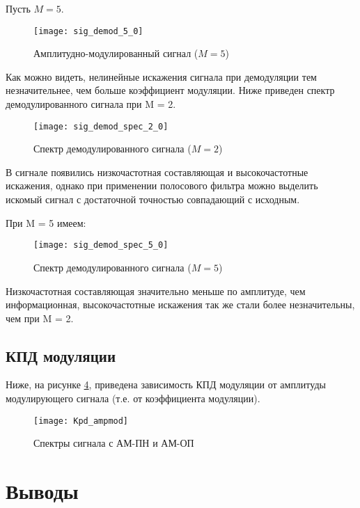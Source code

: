 Пусть $M = 5$.
\begin{figure}[H]
	\begin{center}
		\texttt{[image: sig\_demod\_5\_0]}
		\caption{Амплитудно-модулированный сигнал ($M = 5$)} 
		\label{pic:sig_demod_5_0} %
	\end{center}
\end{figure}
Как можно видеть, нелинейные искажения сигнала при демодуляции тем незначительнее, чем больше коэффициент модуляции.
Ниже приведен спектр демодулированного сигнала при M = 2.
\begin{figure}[H]
	\begin{center}
		\texttt{[image: sig\_demod\_spec\_2\_0]}
		\caption{Спектр демодулированного сигнала ($M = 2$)} 
		\label{pic:sig_demod_spec_2_0} %
	\end{center}
\end{figure}
В сигнале появились низкочастотная составляющая и высокочастотные искажения, однако при применении полосового фильтра можно выделить искомый сигнал с достаточной точностью совпадающий с исходным.

При M = 5 имеем:
\begin{figure}[H]
	\begin{center}
		\texttt{[image: sig\_demod\_spec\_5\_0]}
		\caption{Спектр демодулированного сигнала ($M = 5$)} 
		\label{pic:sig_demod_spec_5_0} %
	\end{center}
\end{figure} 
Низкочастотная составляющая значительно меньше по амплитуде, чем информационная, высокочастотные искажения так же стали более незначительны, чем при M = 2.

\subsection{КПД модуляции}
Ниже, на рисунке \ref{pic:Kpd_ampmod}, приведена зависимость КПД модуляции от амплитуды модулирующего сигнала (т.е. от коэффициента модуляции).
\begin{figure}[H]
	\begin{center}
		\texttt{[image: Kpd\_ampmod]}
		\caption{Спектры сигнала с АМ-ПН и АМ-ОП} 
		\label{pic:Kpd_ampmod} %
	\end{center}
\end{figure}

\section{Выводы}

